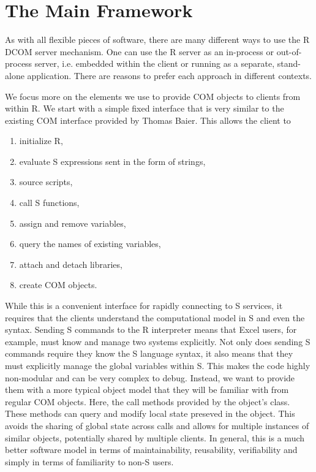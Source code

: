 \documentclass{article}
\begin{document}
\section{The Main Framework}
As with all flexible pieces of software, there are many different ways
to use the R DCOM server mechanism.  One can use the R server as an
in-process or out-of-process server, i.e. embedded within the client
or running as a separate, stand-alone application.  There are reasons
to prefer each approach in different contexts.

We focus more on the elements we use to provide COM objects to clients
from within R.  We start with a simple fixed interface that is very
similar to the existing COM interface provided by Thomas Baier.  This
allows the client to 
\begin{enumerate}
\item initialize R, 
\item evaluate S expressions sent in the form of strings, 
\item source scripts,
\item call S functions,
\item assign and remove variables,
\item query the names of existing variables,
\item attach and detach libraries,
\item create COM objects.
\end{enumerate}

While this is a convenient interface for rapidly connecting to S
services, it requires that the clients understand the computational
model in S and even the syntax. Sending S commands to the R
interpreter means that Excel users, for example, must know and manage
two systems explicitly.  Not only does sending S commands require they
know the S language syntax, it also means that they must explicitly
manage the global variables within S.  This makes the code highly
non-modular and can be very complex to debug.  Instead, we want to
provide them with a more typical object model that they will be
familiar with from regular COM objects.  Here, the call methods
provided by the object's class. These methods can query and modify
local state preseved in the object. This avoids the sharing of global
state across calls and allows for multiple instances of similar
objects, potentially shared by multiple clients.  In general, this is
a much better software model in terms of maintainability, reusability,
verifiability and simply in terms of familiarity to non-S users.
\end{document}
